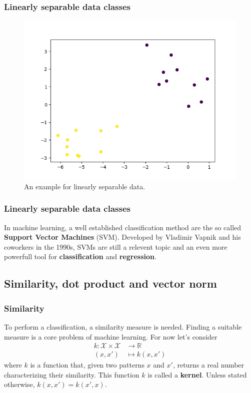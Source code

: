 \documentclass{beamer}
\begin{document}
\begin{frame}{}
	\frametitle{Linearly separable data classes}
	\begin{figure}
		\centering
		\includegraphics[width=0.7\linewidth]{img/LinearSVM_Data.png}
		\caption{ An example for linearly separable data.}
		\label{fig:lineardata}
	\end{figure} 
\end{frame}


\begin{frame}{}
    \frametitle{Linearly separable data classes}
    In machine learning, a well established classification method are the so called \textbf{Support Vector Machines} (SVM). Developed by Vladimir Vapnik and his coworkers in the 1990s, SVMs are still a relevent topic and an even more powerfull tool for \textbf{classification} and \textbf{regression}.
\end{frame}


\subsection{Similarity, dot product and vector norm}

\begin{frame}{}
    \frametitle{Similarity}
    To perform a classification, a similarity measure is needed. Finding a suitable measure is a core problem of machine learning. For now let's consider 
    \begin{equation}
        \begin{aligned}
            k: \mathcal{X} \times \mathcal{X} & \rightarrow \mathbb{R} \\
            (x, x') & \mapsto k(x, x')
        \end{aligned}
    \end{equation}
    where $k$ is a function that, given two patterns $x$ and $x'$, returns a real number characterizing their similarity. This function $k$ is called a \textbf{kernel}. Unless stated otherwise, $k(x, x') = k(x', x)$.
\end{frame}
\end{document}
